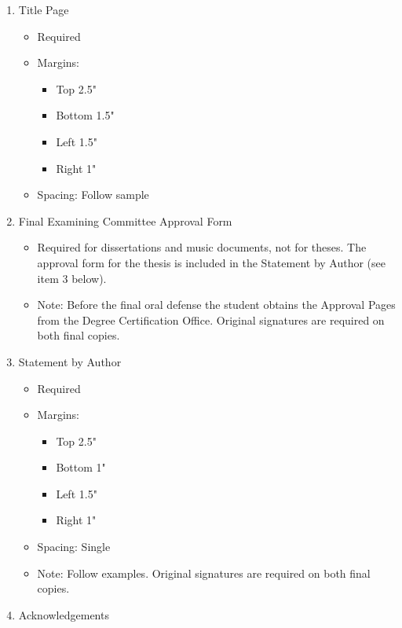\documentclass[draft]{ua-thesis}
\begin{document}
\begin{enumerate}
  \item Title Page
        \begin{itemize}
        \item Required
        \item Margins:
             \begin{itemize}
             \item Top 2.5"
             \item Bottom 1.5"
             \item Left 1.5"
             \item Right 1"
             \end{itemize}
        \item Spacing: Follow sample
        \end{itemize}
  \item Final Examining Committee Approval Form
        \begin{itemize}
        \item Required for dissertations and music documents, not for theses.
          The approval form for the thesis is included in the Statement by
          Author (see item 3 below).
        \item Note: Before the final oral defense the student obtains the
          Approval Pages from the Degree Certification Office. Original
          signatures are required on both final copies.
        \end{itemize}
  \item Statement by Author
        \begin{itemize}
        \item Required
        \item Margins:
             \begin{itemize}
             \item Top 2.5"
             \item Bottom 1"
             \item Left 1.5"
             \item Right 1"
             \end{itemize}
        \item Spacing: Single
        \item Note: Follow examples. Original signatures are required on both
          final copies.
        \end{itemize}
  \item Acknowledgements
        \begin{itemize}

\end{itemize}
\end{enumerate}
\end{document}
